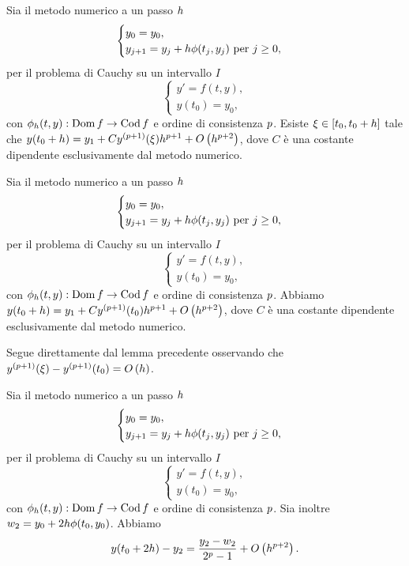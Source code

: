 \begin{Lemma}
	Sia il metodo numerico a un passo $h$
	\[
	\begin{cases}
		y_0 = y_0,\\
		y_{j + 1} = y_j + h\phi(t_j,y_j)\text{ per }j \geq 0,
	\end{cases}
	\]
	per il problema di Cauchy su un intervallo $I$
	\[
	\begin{cases}
		y' = f(t,y),\\
		y(t_0) = y_0,
	\end{cases}
	\]
	con $\phi_h(t,y): \operatorname{Dom}{f} \rightarrow \operatorname{Cod}{f}$ e ordine di consistenza $p$. Esiste $\xi \in [t_0,t_0 + h]$ tale che $y(t_0 + h) = y_1 + C y^{(p + 1)}(\xi) h^{p + 1} + O \left ( h^{p + 2} \right )$, dove $C$ \`e una costante dipendente esclusivamente dal metodo numerico. %
\end{Lemma}
\begin{Corollary}
	Sia il metodo numerico a un passo $h$
	\[
	\begin{cases}
		y_0 = y_0,\\
		y_{j + 1} = y_j + h\phi(t_j,y_j)\text{ per }j \geq 0,
	\end{cases}
	\]
	per il problema di Cauchy su un intervallo $I$
	\[
	\begin{cases}
		y' = f(t,y),\\
		y(t_0) = y_0,
	\end{cases}
	\]
	con $\phi_h(t,y): \operatorname{Dom}{f} \rightarrow \operatorname{Cod}{f}$ e ordine di consistenza $p$. Abbiamo $y(t_0 + h) = y_1 + C y^{(p + 1)}(t_0) h^{p + 1} + O \left ( h^{p + 2} \right )$, dove $C$ \`e una costante dipendente esclusivamente dal metodo numerico.
\end{Corollary}
\Proof Segue direttamente dal lemma precedente osservando che $y^{(p + 1)}(\xi) - y^{(p + 1)}(t_0) = O \left ( h \right )$. \EndProof
\begin{Theorem}
	Sia il metodo numerico a un passo $h$
	\[
	\begin{cases}
		y_0 = y_0,\\
		y_{j + 1} = y_j + h\phi(t_j,y_j)\text{ per }j \geq 0,
	\end{cases}
	\]
	per il problema di Cauchy su un intervallo $I$
	\[
	\begin{cases}
		y' = f(t,y),\\
		y(t_0) = y_0,
	\end{cases}
	\]
	con $\phi_h(t,y): \operatorname{Dom}{f} \rightarrow \operatorname{Cod}{f}$ e ordine di consistenza $p$. Sia inoltre $w_2 = y_0 + 2 h\phi(t_0,y_0)$. Abbiamo
	\[
		y(t_0 + 2 h) - y_2 = \frac{y_2 - w_2}{2^p - 1} + O \left ( h^{p + 2} \right ).
	\]
\end{Theorem}
